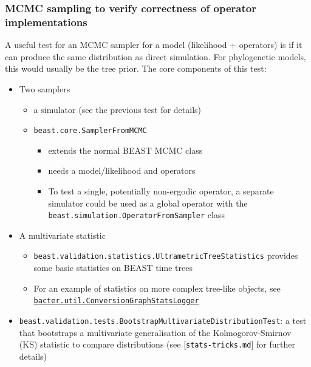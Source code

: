 \documentclass[oneside]{article}
\begin{document}
\subsubsection{MCMC sampling to verify correctness of operator
implementations}\label{mcmc-sampling-to-verify-correctness-of-operator-implementations}

A useful test for an MCMC sampler for a model (likelihood + operators)
is if it can produce the same distribution as direct simulation. For
phylogenetic models, this would usually be the tree prior. The core
components of this test:

\begin{itemize}
\item
  Two samplers

  \begin{itemize}
  \item
    a simulator (see the previous test for details)
  \item
    \texttt{beast.core.SamplerFromMCMC}

    \begin{itemize}
    \item
      extends the normal BEAST MCMC class
    \item
      needs a model/likelihood and operators
    \item
      To test a single, potentially non-ergodic operator, a separate
      simulator could be used as a global operator with the
      \texttt{beast.simulation.OperatorFromSampler} class
    \end{itemize}
  \end{itemize}
\item
  A multivariate statistic

  \begin{itemize}
  \item
    \texttt{beast.validation.statistics.UltrametricTreeStatistics}
    provides some basic statistics on BEAST time trees
  \item
    For an example of statistics on more complex tree-like objects, see
    \href{https://github.com/tgvaughan/bacter/blob/master/src/bacter/util/ConversionGraphStatsLogger.java}{\texttt{bacter.util.ConversionGraphStatsLogger}}
  \end{itemize}
\item
  \texttt{beast.validation.tests.BootstrapMultivariateDistributionTest}:
  a test that bootstraps a multivariate generalisation of the
  Kolmogorov-Smirnov (KS) statistic to compare distributions (see
  {[}\texttt{stats-tricks.md}{]} for further details)
\end{itemize}
\end{document}

